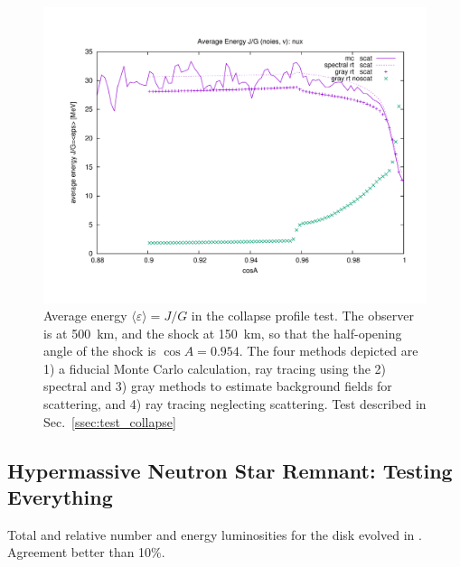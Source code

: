 \documentclass[aps,floatfix,prd,superscriptaddress,twocolumn]{revtex4-1}
\newcommand{\todo}[1]{\marginpar{\tiny{\textcolor{red}{#1}}}}
\begin{document}
\begin{figure}
  \includegraphics[width=\columnwidth]{fig-collapse_profile-avg_eps_vs_cosA}
  \caption{Average energy $\langle\varepsilon\rangle=J/G$
    in the collapse profile test.
    The observer is at 500~km, and the shock at 150~km,
    so that the half-opening angle of the shock is $\cos A=0.954$.
    The four methods depicted are 1) a fiducial Monte Carlo calculation,
    ray tracing using the 2) spectral and 3) gray methods to estimate background
    fields for scattering, and 4) ray tracing neglecting scattering.
    Test described in Sec.~\ref{ssec:test_collapse}}
  \label{fig:avg_eps_collapse}
\end{figure}

\subsection{Hypermassive Neutron Star Remnant:
  Testing Everything}
\label{ssec:test_disk_comparison}
Total and relative number and energy luminosities for the disk evolved
in \cite{fouc2016-m1_evolve_n}.
Agreement better than 10\%.
\todo{get accurage M1 numbers from Francois}
\end{document}
